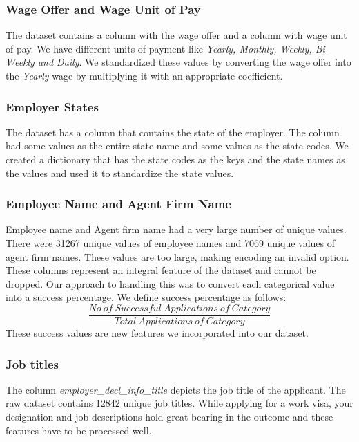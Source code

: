 \documentclass[conference]{IEEEtran}
\begin{document}
\subsubsection{\textbf{Wage Offer and Wage Unit of Pay}}
The dataset contains a column with the wage offer and a column with wage unit of pay. We have different units of payment like \textit{Yearly, Monthly, Weekly, Bi-Weekly and Daily}. We standardized these values by converting the wage offer into the \textit{Yearly} wage by multiplying it with an appropriate coefficient.

\subsubsection{\textbf{Employer States}}
The dataset has a column that contains the state of the employer. The column had some values as the entire state name and some values as the state codes. We created a dictionary that has the state codes as the keys and the state names as the values and used it to standardize the state values.

\subsubsection{\textbf{Employee Name and Agent Firm Name}}
Employee name and Agent firm name had a very large number of unique values. There were 31267 unique values of employee names and 7069 unique values of agent firm names. These values are too large, making encoding an invalid option. These columns represent an integral feature of the dataset and cannot be dropped. Our approach to handling this was to convert each categorical value into a success percentage. We define success percentage as follows:
\begin{equation}
\frac{No\ of\ Successful\ Applications\ of\ Category} {Total\ Applications\ of\ Category}
\end{equation}
These success values are new features we incorporated into our dataset.

\subsubsection{\textbf{Job titles}}
The column \textit{employer\_decl\_info\_title} depicts the job title of the applicant. The raw dataset contains 12842 unique job titles. While applying for a work visa, your designation and job descriptions hold great bearing in the outcome and these features have to be processed well.
\end{document}
